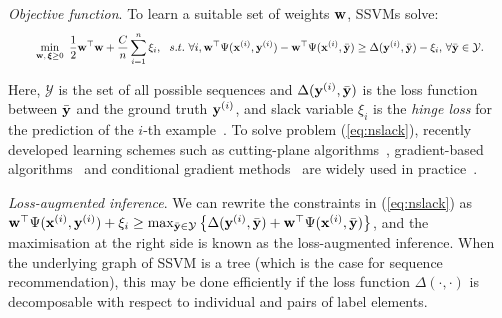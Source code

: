 \emph{Objective function}.
To learn a suitable set of weights $\mathbf{w}$, SSVMs solve: %
\begin{equation}
\label{eq:nslack}
\resizebox{0.93\linewidth}{!}{$\displaystyle
\begin{aligned}
\min_{\w, \, \bm{\xi} \ge 0} ~\frac{1}{2} \w^\top \w + \frac{C}{n} \sum_{i=1}^n \xi_i,  ~~s.t.~  \forall i, 
  \w^\top \Psi(\x^{(i)}, \y^{(i)}) - \w^\top \Psi(\x^{(i)}, \bar{\y}) \ge
  \Delta(\y^{(i)}, \bar{\y}) - \xi_i, \, \forall \bar\y \in \mathcal{Y}.
\end{aligned}
$}
\end{equation}

Here, 
$\mathcal{Y}$ is the set of all possible sequences
and $\Delta(\mathbf{y}^{({i})}, \bar{\mathbf{y}})$ is the loss function between $\bar{\mathbf{y}}$ and the ground truth $\mathbf{y}^{({i})}$,
and slack variable $\xi_i$ is the \emph{hinge loss} for the prediction of the $i$-th example~\cite{tsochantaridis2005large}.
To solve problem (\ref{eq:nslack}),
recently developed learning schemes such as 
cutting-plane algorithms~\cite{joachims2009predicting}, %
gradient-based algorithms~\cite{ratliff2006subgradient} %
and conditional gradient methods~\cite{lacoste2013block} %
are widely used in practice~\cite{muller2014methods}.


\emph{Loss-augmented inference}.
We can rewrite the constraints in (\ref{eq:nslack}) as 
$\mathbf{w}^\top \Psi(\mathbf{x}^{({i})}, \mathbf{y}^{({i})}) + \xi_i \ge 
\max_{\bar{\mathbf{y}} \in \mathcal{Y}} \left\{ \Delta(\mathbf{y}^{({i})}, \bar{\mathbf{y}}) + \mathbf{w}^\top \Psi(\mathbf{x}^{({i})}, \bar{\mathbf{y}}) \right\}$,
and the maximisation at the right side is known as the loss-augmented inference.
When the underlying graph of SSVM is a tree (which is the case for sequence recommendation),
this may be done efficiently if the loss function $\Delta(\cdot,\cdot)$ is decomposable
with respect to individual and pairs of label elements.

